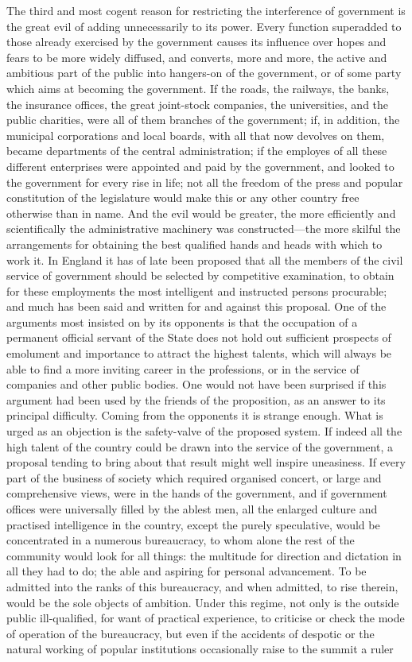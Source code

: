\documentclass[11pt,openany]{book}
\begin{document}
The third and most cogent reason for restricting the interference of government is the great evil of adding unnecessarily to its power. Every function superadded to those already exercised by the government causes its influence over hopes and fears to be more widely diffused, and converts, more and more, the active and ambitious part of the public into hangers-on of the government, or of some party which aims at becoming the government. If the roads, the railways, the banks, the insurance offices, the great joint-stock companies, the universities, and the public charities, were all of them branches of the government; if, in addition, the municipal corporations and local boards, with all that now devolves on them, became departments of the central administration; if the employes of all these different enterprises were appointed and paid by the government, and looked to the government for every rise in life; not all the freedom of the press and popular constitution of the legislature would make this or any other country free otherwise than in name. And the evil would be greater, the more efficiently and scientifically the administrative machinery was constructed---the more skilful the arrangements for obtaining the best qualified hands and heads with which to work it. In England it has of late been proposed that all the members of the civil service of government should be selected by competitive examination, to obtain for these employments the most intelligent and instructed persons procurable; and much has been said and written for and against this proposal. One of the arguments most insisted on by its opponents is that the occupation of a permanent official servant of the State does not hold out sufficient prospects of emolument and importance to attract the highest talents, which will always be able to find a more inviting career in the professions, or in the service of companies and other public bodies. One would not have been surprised if this argument had been used by the friends of the proposition, as an answer to its principal difficulty. Coming from the opponents it is strange enough. What is urged as an objection is the safety-valve of the proposed system. If indeed all the high talent of the country could be drawn into the service of the government, a proposal tending to bring about that result might well inspire uneasiness. If every part of the business of society which required organised concert, or large and comprehensive views, were in the hands of the government, and if government offices were universally filled by the ablest men, all the enlarged culture and practised intelligence in the country, except the purely speculative, would be concentrated in a numerous bureaucracy, to whom alone the rest of the community would look for all things: the multitude for direction and dictation in all they had to do; the able and aspiring for personal advancement. To be admitted into the ranks of this bureaucracy, and when admitted, to rise therein, would be the sole objects of ambition. Under this regime, not only is the outside public ill-qualified, for want of practical experience, to criticise or check the mode of operation of the bureaucracy, but even if the accidents of despotic or the natural working of popular institutions occasionally raise to the summit a ruler 
\end{document}
